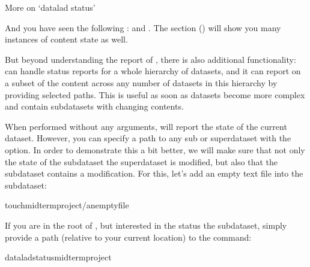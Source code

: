 \begin{findoutmore}[label={fom-status}, before title={\thetcbcounter\ }, float, check odd page=true]{More on ‘datalad status’}
\begin{itemize}
\end{itemize}

\sphinxAtStartPar
And you have seen the following :  and .
The section {\hyperref[\detokenize{basics/101-136-filesystem:file-system}]{}} () will show you many instances of  content
state as well.

\sphinxAtStartPar
But beyond understanding the report of , there is also
additional functionality:
 can handle status reports for a whole hierarchy
of datasets, and it can report on a subset of the content across any number of
datasets in this hierarchy by providing selected paths. This is useful as soon
as datasets become more complex and contain subdatasets with changing contents.

\sphinxAtStartPar
When performed without any arguments,  will report
the state of the current dataset. However, you can specify a path to any
sub\sphinxhyphen{} or superdataset with the  option.
In order to demonstrate this a bit better, we will make sure that not only the
state of the subdataset  the superdataset is modified, but also that the
subdataset contains a modification. For this, let’s add an empty text file into
the  subdataset:

\begin{sphinxVerbatim}[commandchars=\\\{\}]
touchmidterm\PYGZus{}project/an\PYGZus{}empty\PYGZus{}file
\end{sphinxVerbatim}

\sphinxAtStartPar
If you are in the root of , but interested in the status
 the subdataset, simply provide a path (relative to your current location)
to the command:

\begin{sphinxVerbatim}[commandchars=\\\{\}]
dataladstatusmidterm\PYGZus{}project
\end{sphinxVerbatim}


\end{findoutmore}
